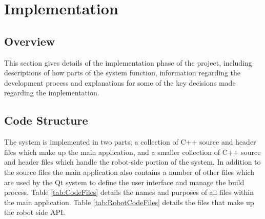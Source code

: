 
\chapter[Implementation]{Implementation} %

\label{Chapter9} %


\section{Overview}
This section gives details of the implementation phase of the project, including descriptions of how parts of the system function, information regarding the development process and explanations for some of the key decisions made regarding the implementation. 


\section{Code Structure}
The system is implemented in two parts; a collection of C++ source and header files which make up the main application, and a smaller collection of C++ source and header files which handle the robot-side portion of the system. In addition to the source files the main application also contains a number of other files which are used by the Qt system to define the user interface and manage the build process. Table \ref{tab:CodeFiles} details the names and purposes of all files within the main application. Table \ref{tab:RobotCodeFiles} details the files that make up the robot side API.

